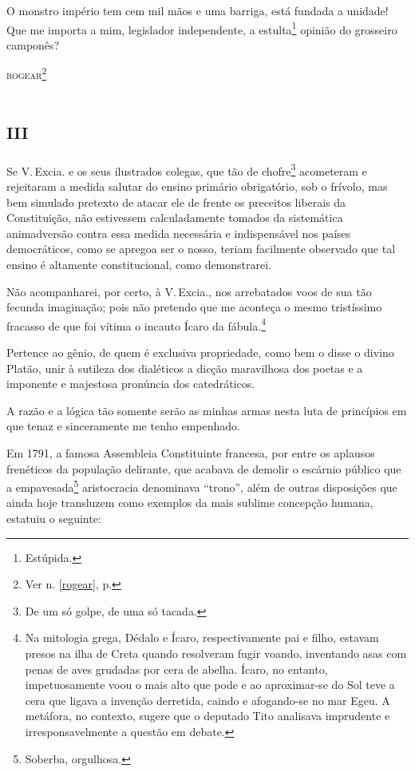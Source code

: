 O monstro império tem cem mil mãos e uma barriga, está fundada a
unidade! Que me importa a mim, legislador independente, a
estulta\footnote{Estúpida.} opinião do grosseiro camponês?

\textsc{rogear}\footnote{Ver n. \ref{rogear}, p. \pageref{rogear}}

\section{\textsc{iii}}

Se V.\,Excia. e os seus ilustrados colegas, que tão de chofre\footnote{
  De um só golpe, de uma só tacada.} acometeram e rejeitaram a medida
salutar do ensino primário obrigatório, sob o frívolo, mas bem simulado
pretexto de atacar ele de frente os preceitos liberais da Constituição,
não estivessem calculadamente tomados da sistemática animadversão contra
essa medida necessária e indispensável nos países democráticos, como se
apregoa ser o nosso, teriam facilmente observado que tal ensino é
altamente constitucional, como demonstrarei.

Não acompanharei, por certo, à V.\,Excia., nos arrebatados voos de sua
tão fecunda imaginação; pois não pretendo que me aconteça o mesmo
tristíssimo fracasso de que foi vítima o incauto Ícaro da
fábula.\footnote{Na mitologia grega, Dédalo e Ícaro, respectivamente
  pai e filho, estavam presos na ilha de Creta quando resolveram fugir
  voando, inventando asas com penas de aves grudadas por cera de abelha.
  Ícaro, no entanto, impetuosamente voou o mais alto que pode e ao
  aproximar-se do Sol teve a cera que ligava a invenção derretida,
  caindo e afogando-se no mar Egeu. A metáfora, no contexto, sugere que
  o deputado Tito analisava imprudente e irresponsavelmente a questão em
  debate.}

Pertence ao gênio, de quem é exclusiva propriedade, como bem o disse o
divino Platão, unir à sutileza dos dialéticos a dicção maravilhosa dos
poetas e a imponente e majestosa pronúncia dos catedráticos.

A razão e a lógica tão somente serão as minhas armas nesta luta de
princípios em que tenaz e sinceramente me tenho empenhado.

Em 1791, a famosa Assembleia Constituinte francesa, por entre os
aplausos frenéticos da população delirante, que acabava de demolir o
escárnio público que a empavesada\footnote{Soberba, orgulhosa.}
aristocracia denominava ``trono'', além de outras disposições que ainda
hoje transluzem como exemplos da mais sublime concepção humana, estatuiu
o seguinte:

